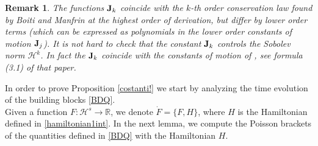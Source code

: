 \documentclass[reqno,11pt]{amsart}
\theoremstyle{plain}
\numberwithin{equation}{section}
\newtheorem{remark}[theorem]{Remark}
\newcommand{\R}{\mathbb{R}}
\renewcommand{\H}{\mathcal{H}}
\newcommand{\I}{{\texttt{\bf J}}}
\begin{document}
{\begin{remark}
	The functions  $\I_k$ coincide with the $k$-th order conservation law found by Boiti and Manfrin at the highest order of derivation, but differ by lower order terms (which can be expressed as polynomials in the lower order constants of motion $\I_j$).  It is not hard to check that the constant $\I_k$  controls the Sobolev norm $\H^k$. In fact the $\I_k$ coincide with the constants of motion of \cite{campos}, see formula (3.1) of that paper. 
\end{remark}

\smallskip
In order to prove Proposition \ref{costanti!} we start by analyzing the time evolution of the building blocks \eqref{BDQ}.
\\
Given a function $F : {\mathcal H}^s \to \R$, we denote $\dot F = \{ F,H \}$, where $H$ is the Hamiltonian defined in \eqref{hamiltonian1int}.
In the next lemma, we compute the Poisson brackets of the quantities defined in \eqref{BDQ} with the Hamiltonian $H$.

}
\end{document}

